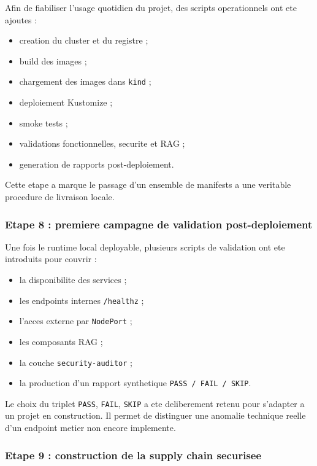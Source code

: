Afin de fiabiliser l'usage quotidien du projet, des scripts operationnels ont ete ajoutes :

\begin{itemize}
  \item creation du cluster et du registre ;
  \item build des images ;
  \item chargement des images dans \texttt{kind} ;
  \item deploiement Kustomize ;
  \item smoke tests ;
  \item validations fonctionnelles, securite et RAG ;
  \item generation de rapports post-deploiement.
\end{itemize}

Cette etape a marque le passage d'un ensemble de manifests a une veritable procedure de livraison locale.

\subsubsection{Etape 8 : premiere campagne de validation post-deploiement}

Une fois le runtime local deployable, plusieurs scripts de validation ont ete introduits pour couvrir :

\begin{itemize}
  \item la disponibilite des services ;
  \item les endpoints internes \texttt{/healthz} ;
  \item l'acces externe par \texttt{NodePort} ;
  \item les composants RAG ;
  \item la couche \texttt{security-auditor} ;
  \item la production d'un rapport synthetique \texttt{PASS / FAIL / SKIP}.
\end{itemize}

Le choix du triplet \texttt{PASS}, \texttt{FAIL}, \texttt{SKIP} a ete deliberement retenu pour s'adapter a un projet en construction. Il permet de distinguer une anomalie technique reelle d'un endpoint metier non encore implemente.

\subsubsection{Etape 9 : construction de la supply chain securisee}

